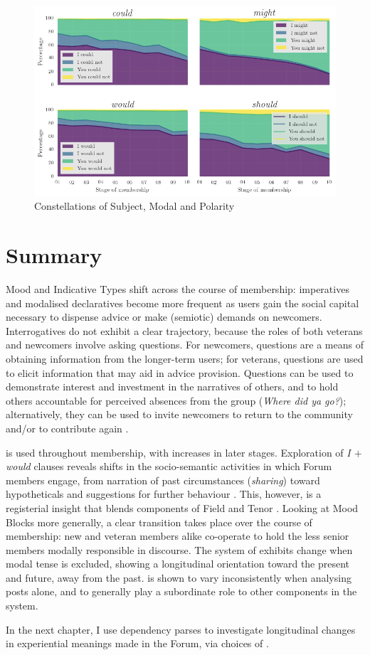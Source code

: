 \begin{figure}[htb]
    \centering
    \includegraphics[width=.8\textwidth]{../images/subjmodpol.png}
    \caption{Constellations of Subject, Modal and Polarity}
    \label{fig:subjmodpol}
    \end{figure}

\section{Summary}

Mood and Indicative Types shift across the course of membership: imperatives and modalised declaratives become more frequent as users gain the social capital necessary to dispense advice or make (semiotic) demands on newcomers. Interrogatives do not exhibit a clear trajectory, because the  roles of both veterans and newcomers involve asking questions. For newcomers, questions are a means of obtaining information from the longer\hyp{}term users; for veterans, questions are used to elicit information that may aid in advice provision. Questions can be used to demonstrate interest and investment in the narratives of others, and to hold others accountable for perceived absences from the group (\emph{Where did ya go?}); alternatively, they can be used to invite newcomers to return to the community and\slash or to contribute again \cite{paulus_`please_2015}.

 is used throughout membership, with increases in later stages. Exploration of \emph{I $+$ would} clauses reveals shifts in the socio\hyp{}semantic activities in which \gls{Forum} members engage, from narration of past circumstances (\emph{sharing}) toward hypotheticals and suggestions for further behaviour \cite[\emph{advising}---see][]{matthiessen_applying_2013,matthiessen_modeling_2015}. This, however, is a registerial insight that blends components of Field and Tenor \cite{Matthiessen2015}. Looking at Mood Blocks more generally, a clear transition takes place over the course of membership: new and veteran members alike co\hyp{}operate to hold the less senior \glspl{member} modally responsible in discourse. The system of  exhibits change when modal tense is excluded, showing a longitudinal orientation toward the present and future, away from the past.  is shown to vary inconsistently when analysing \glspl{post} alone, and to generally play a subordinate role to other components in the  system.

In the next chapter, I use dependency parses to investigate longitudinal changes in experiential meanings made in the \gls{Forum}, via choices of .
